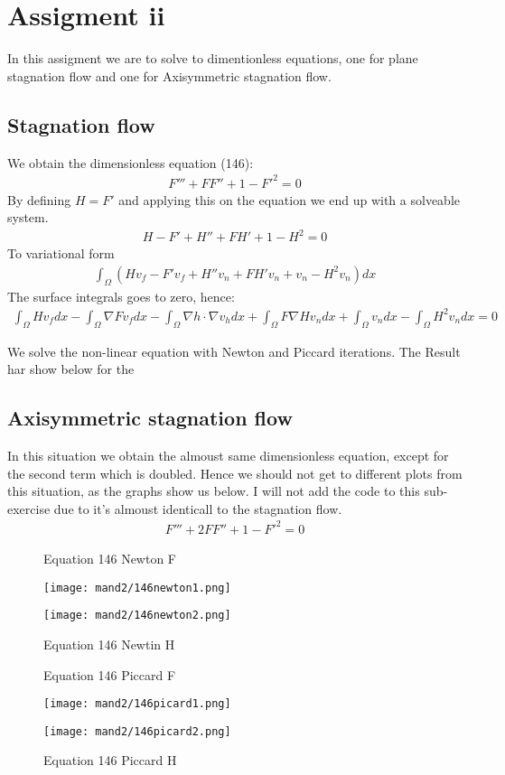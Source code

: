 \documentclass[a4paper,norsk]{article}
\begin{document}
\section*{Assigment ii}
In this assigment we are to solve to dimentionless equations, one for plane stagnation flow and one for Axisymmetric stagnation flow. 

\subsection*{Stagnation flow}
We obtain the dimensionless equation (146):
\begin{align*}
	F''' + FF'' + 1 -F'^2 = 0
\end{align*}
By defining $ H = F'$ and applying this on the equation we end up with a solveable system.
\begin{align*}
	H-F'+H''+FH'+1-H^2 = 0
\end{align*}
To variational form
\begin{align*}
	\int_{\Omega}^{} (Hv_f-F'v_f+H''v_n+FH'v_n+v_n-H^2v_n)dx 
\end{align*}
The surface integrals goes to zero, hence:
\begin{align*}
	\int_{\Omega}^{}Hv_fdx-\int_{\Omega}^{}\nabla Fv_fdx-
	\int_{\Omega}^{}\nabla h \cdot \nabla v_h dx + \int_{\Omega}^{}F\nabla H v_n dx +
	\int_{\Omega}^{}v_ndx -\int_{\Omega}^{}H^2 v_ndx = 0
\end{align*}


We solve the non-linear equation with Newton and Piccard iterations. The Result har show below for the 


\subsection*{Axisymmetric stagnation flow}
In this situation we obtain the almoust same dimensionless equation, except for the second term which is doubled. Hence we should not get to different plots from this situation, as the graphs show us below. I will not add the code to this sub-exercise due to it's almoust identicall to the stagnation flow.
\begin{align*}
	F''' + 2FF'' + 1 -F'^2 = 0
\end{align*}

\begin{figure}	
	\centering
	\caption*{Equation 146 Newton F}

	\texttt{[image: mand2/146newton1.png]}
	\caption*{Equation 146 Newtin H}
	\texttt{[image: mand2/146newton2.png]}
\end{figure}
\begin{figure}	
	\centering
	\caption*{Equation 146 Piccard F}
	\texttt{[image: mand2/146picard1.png]}
	\caption*{Equation 146 Piccard H}
	\texttt{[image: mand2/146picard2.png]}
\end{figure}
\end{document}
